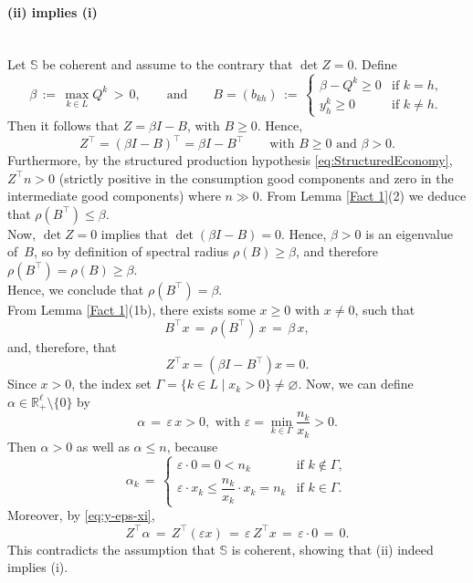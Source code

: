 \documentclass[11pt,fleqn]{article}
\begin{document}
\paragraph{(ii) implies (i)} \ \ 
\\
Let $\mathbb S$ be coherent and assume to the contrary that $\det Z = 0$. Define
\[
\beta \, :=\, \max_{k \in L} Q^{k} \, >\, 0,
\qquad \mbox{and} \qquad
B = (b_{kh}) \, := \,
\begin{cases}
\beta - Q^{k} \geqslant 0 & \text{if } k = h,\\
y^k_{h} \geqslant 0    & \text{if } k \neq h.
\end{cases}
\]
Then it follows that $Z= \beta I - B$, with $B \geqslant 0$. Hence,
\[
Z^\top = \left( \beta I - B \right)^\top = \beta I - B^\top \qquad \mbox{with } B \geqslant 0 \mbox{ and } \beta >0 .
\]
Furthermore, by the structured production hypothesis  \eqref{eq:StructuredEconomy}, $Z^\top n>0$ (strictly positive in the consumption good components and zero in the intermediate good components) where $n\gg0$. From Lemma \ref{Fact 1}(2) we deduce that $\rho (B^\top ) \leqslant \beta$. \\
Now, $\det Z = 0$ implies that $\det(\beta I-B) = 0$. Hence, $\beta >0$ is an eigenvalue of~$B$, so by definition of spectral radius $\rho(B)\geqslant \beta$, and therefore $\rho (B^\top ) = \rho (B) \geqslant \beta$. \\
Hence, we conclude that $\rho (B^\top) = \beta$. \\[1ex]
From Lemma \ref{Fact 1}(1b), there exists some $x\geqslant 0$ with $x \neq 0$, such that
\[
B^{\top}x \, =\,  \rho(B^{\top})\,x \, =\,  \beta\,x,
\]
and, therefore, that 
\begin{equation}\label{eq:y-eps-xi}
Z^\top x = (\beta I-B^{\top})x = 0. 
\end{equation}
Since $x >0$, the index set $ \Gamma = \{ k \in L \mid x_k >0 \} \neq \varnothing$. Now, we can define $\alpha \in \mathbb R^{\ell}_+\setminus \{0\}$ by
\[
\alpha \, =\,  \varepsilon\,x >0,\,\,\mbox{with } \varepsilon = \min_{k \in   \Gamma} \frac{n_k}{x_k} >0 .
\]
Then $\alpha > 0$ as well as $\alpha \leqslant n$, because
\[
\alpha_{k} \, =\, 
\begin{cases}
\varepsilon\cdot 0 = 0 < n_{k} & \text{if } k\notin \Gamma ,\\
\varepsilon\cdot x_{k} \leqslant \dfrac{n_{k}}{x_{k}}\cdot x_{k} = n_{k}
& \text{if } k \in\Gamma.
\end{cases}
\]
Moreover, by \eqref{eq:y-eps-xi},
\[
Z^{\top} \alpha \, {=}\,  Z^{\top}(\varepsilon x) \, =\,  \varepsilon\, Z^{\top}x \, =\,  \varepsilon\cdot 0 \, =\,  0.
\]
This contradicts the assumption that $\mathbb S$ is coherent, showing that (ii) indeed implies (i).
\end{document}
